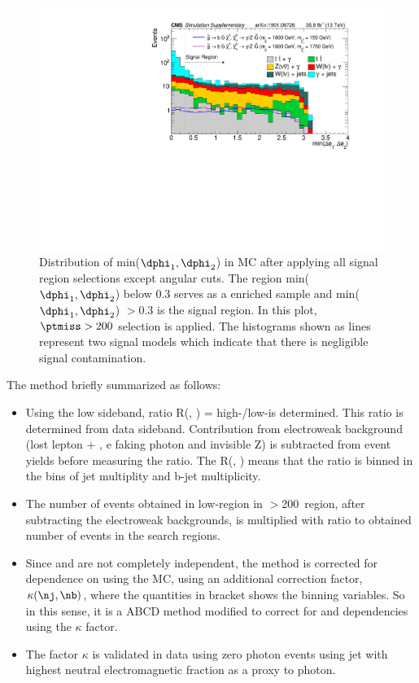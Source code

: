 \begin{figure}[h!]
\centering
\includegraphics[width=0.8\linewidth]{../Figures/Chap3/anaPublic/supp_Sim_mindPhi1dPhi2_T5bbbbZG}
\captionsetup{width=.9\linewidth}
\caption[min($\dphi_{1},\dphi_{2}$) in MC]{Distribution of min($\dphi_{1},\dphi_{2}$) in MC after applying all signal region selections except angular cuts. The region min($\dphi_{1},\dphi_{2}$) below 0.3 serves as a \gjets enriched sample and min($\dphi_{1},\dphi_{2}$) $>0.3$ is the signal region. In this plot, $\ptmiss > 200$ \gev selection is applied. The histograms shown as lines represent two signal models which indicate that there is negligible signal contamination.}
\label{fig:supp_Sim_mindPhi1dPhi2_T5bbbbZG}
\end{figure}

The method briefly summarized as follows: 
\begin{itemize}
 \item Using the low \ptmiss sideband, ratio R(\nj, \nb) = high-\dphi/low-\dphi is determined. This ratio is determined from data sideband. Contribution from electroweak background (lost lepton + \tauh, e faking photon and invisible Z) is subtracted from event yields before measuring the ratio. The R(\nj, \nb) means that the ratio is binned in the bins of jet multiplity and b-jet multiplicity.
 \item The number of events obtained in low-\dphi region in \ptmiss$>$200~\gev region, after subtracting the electroweak backgrounds, is multiplied with ratio to obtained number of events in the search regions. 
 \item Since \dphi and \ptmiss are not completely independent, the method is corrected for dependence on \ptmiss using the MC, using an additional correction factor, $\kappa(\nj, \nb)$, where the quantities in bracket shows the binning variables. So in this sense, it is a ABCD method modified to correct for \dphi and \ptmiss dependencies using the $\kappa$ factor.
 \item The factor $\kappa$ is validated in data using zero photon events using jet with highest neutral electromagnetic fraction as a proxy to photon.
\end{itemize}

